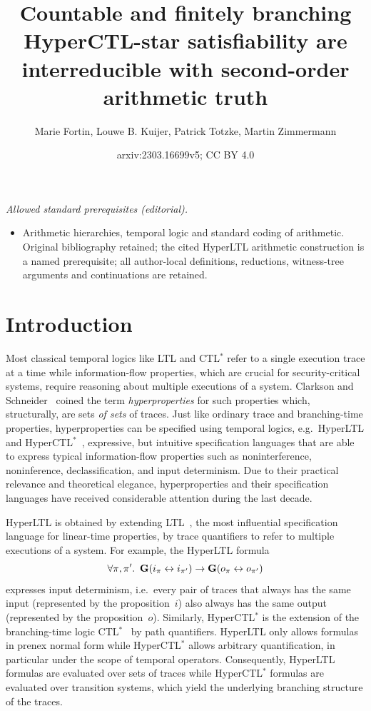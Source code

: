 \documentclass[dvipsnames,10pt,a4paper]{amsart}
\title{Countable and finitely branching HyperCTL-star satisfiability are interreducible with second-order arithmetic truth}
\author{Marie Fortin, Louwe B. Kuijer, Patrick Totzke, Martin Zimmermann}
\date{arxiv:2303.16699v5; CC BY 4.0}
\theoremstyle{definition}
\theoremstyle{remark}
\newcommand{\G}{\mathop{\mathbf{G}\vphantom{a}}\nolimits}
\newcommand{\ltl}{{LTL}\xspace}
\newcommand{\ctlstar}{{CTL$^*$}\xspace}
\newcommand{\hyltl}{{HyperLTL}\xspace}
\newcommand{\hyctlstar}{{HyperCTL$^*$}\xspace}
\begin{document}
\maketitle
\noindent\textit{Allowed standard prerequisites (editorial).}\begin{itemize}
\item Arithmetic hierarchies, temporal logic and standard coding of arithmetic. Original bibliography retained; the cited HyperLTL arithmetic construction is a named prerequisite; all author-local definitions, reductions, witness-tree arguments and continuations are retained.
\end{itemize}\medskip
\section{Introduction}
\label{sec:intro}

Most classical temporal logics like \ltl and \ctlstar refer to a single execution trace at a time while information-flow properties, which are crucial for security-critical systems,
require reasoning about multiple executions of a system. 
Clarkson and Schneider~\cite{ClarksonS10} coined the term \emph{hyperproperties} for such properties which, structurally, are sets \emph{of sets} of traces.
Just like ordinary trace and branching-time properties, hyperproperties can be specified using temporal logics, e.g.\ \hyltl and \hyctlstar~\cite{ClarksonFKMRS14}, expressive, but intuitive specification languages that are able to express typical information-flow properties such as noninterference, noninference, declassification, and input determinism.
Due to their practical relevance and theoretical elegance, hyperproperties and their specification languages have received considerable attention during the last decade.

\hyltl is obtained by extending \ltl~\cite{Pnueli77}, the most influential specification language for linear-time properties, by trace quantifiers to refer to multiple executions of a system. 
For example, the \hyltl formula
\[\forall \pi, \pi'.\ \G( i_\pi \leftrightarrow i_{\pi'}) \rightarrow \G (o_\pi \leftrightarrow o_{\pi'}) \]
expresses input determinism, i.e.\ every pair of traces that always has the same input (represented by the proposition~$i$) also always has the same output (represented by the proposition~$o$). 
Similarly, \hyctlstar is the extension of the branching-time logic \ctlstar~\cite{EmersonH86} by path quantifiers. 
\hyltl only allows formulas in prenex normal form while \hyctlstar allows arbitrary quantification, in particular under the scope of temporal operators. 
Consequently, \hyltl formulas are evaluated over sets of traces while \hyctlstar formulas are evaluated over transition systems, which yield the underlying branching structure of the traces. 
\end{document}
